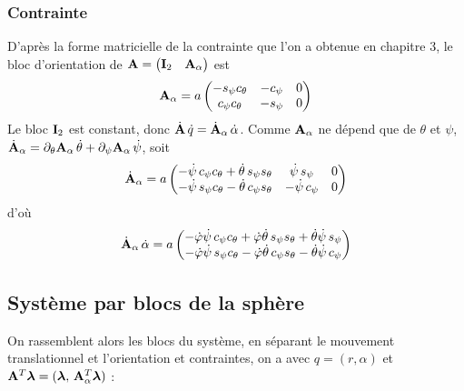 \subsubsection{Contrainte}

D'après la forme matricielle de la contrainte que l'on a obtenue en chapitre 3, le bloc
d'orientation de $\mathbf{A} = \begin{pmatrix} \mathbf{I}_2 & \mathbf{A}_\alpha
\end{pmatrix}$ est
\[
    \mathbf{A}_\alpha = a\begin{pmatrix}
        -s_\psi c_\theta & -c_\psi & 0\\
        c_\psi c_\theta & -s_\psi & 0
    \end{pmatrix}
\]
Le bloc $\mathbf{I}_2$ est constant, donc
$\dot{\mathbf{A}}\,\dot q = \dot{\mathbf{A}}_\alpha\,\dot\alpha$. Comme
$\mathbf{A}_\alpha$ ne dépend que de $\theta$ et $\psi$,
$\dot{\mathbf{A}}_\alpha = \partial_\theta\mathbf{A}_\alpha\,\dot\theta
+ \partial_\psi\mathbf{A}_\alpha\,\dot\psi$, soit
\[
    \dot{\mathbf{A}}_\alpha = a\begin{pmatrix}
        -\dot\psi\,c_\psi c_\theta + \dot\theta\,s_\psi s_\theta
            & \dot\psi\,s_\psi & 0\\
        -\dot\psi\,s_\psi c_\theta - \dot\theta\,c_\psi s_\theta
            & -\dot\psi\,c_\psi & 0
    \end{pmatrix}
\]
d'où
\[
    \dot{\mathbf{A}}_\alpha\,\dot\alpha = a\begin{pmatrix}
        -\dot\varphi\dot\psi\,c_\psi c_\theta
        + \dot\varphi\dot\theta\,s_\psi s_\theta
        + \dot\theta\dot\psi\,s_\psi\\
        -\dot\varphi\dot\psi\,s_\psi c_\theta
        - \dot\varphi\dot\theta\,c_\psi s_\theta
        - \dot\theta\dot\psi\,c_\psi
    \end{pmatrix}
\]

\subsection{Système par blocs de la sphère}

On rassemblent alors les blocs du système, en séparant le mouvement translationnel et l'orientation et contraintes, on a avec $q = (r,\alpha)$ et
$\mathbf{A}^T\bm{\lambda} = (\bm{\lambda},\,\mathbf{A}_\alpha^T\bm{\lambda})$ : 

